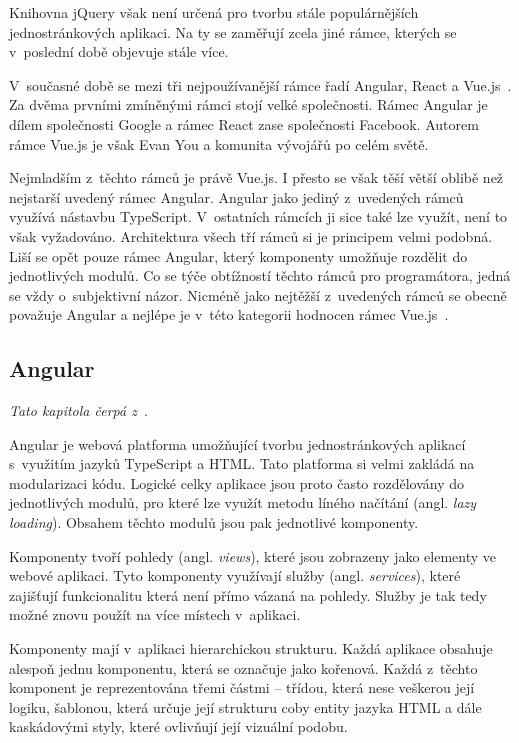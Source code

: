 Knihovna jQuery však není určená pro tvorbu stále populárnějších jednostránkových aplikaci. Na ty se zaměřují zcela jiné rámce, kterých se v~poslední době objevuje stále více.

V~současné době se mezi tři nejpoužívanější rámce řadí Angular, React a Vue.js~\cite{bib:js-framework}. Za dvěma prvními zmíněnými rámci stojí velké společnosti. Rámec Angular je dílem společnosti Google a rámec React zase společnosti Facebook. Autorem rámce Vue.js je však Evan You a komunita vývojářů po celém světě.

Nejmladším z~těchto rámců je právě Vue.js. I přesto se však těší větší oblibě než nejstarší uvedený rámec Angular. Angular jako jediný z~uvedených rámců využívá nástavbu TypeScript. V~ostatních rámcích ji sice také lze využít, není to však vyžadováno. Architektura všech tří rámců si je principem velmi podobná. Liší se opět pouze rámec Angular, který komponenty umožňuje rozdělit do jednotlivých modulů. Co se týče obtížností těchto rámců pro programátora, jedná se vždy o~subjektivní názor. Nicméně jako nejtěžší z~uvedených rámců se obecně považuje Angular a nejlépe je v~této kategorii hodnocen rámec Vue.js~\cite{bib:angular-vs-react-vs-vue}.



\subsection{Angular}
\emph{Tato kapitola čerpá z~\cite{bib:ng-arch}}.

Angular je webová platforma umožňující tvorbu jednostránkových aplikací s~využitím jazyků TypeScript a HTML. Tato platforma si velmi zakládá na modularizaci kódu. Logické celky aplikace jsou proto často rozdělovány do jednotlivých modulů, pro které lze využít metodu líného načítání (angl. \emph{lazy loading}). Obsahem těchto modulů jsou pak jednotlivé komponenty. 

Komponenty tvoří pohledy (angl. \emph{views}), které jsou zobrazeny jako elementy ve webové aplikaci. Tyto komponenty využívají služby (angl. \emph{services}), které zajišťují funkcionalitu která není přímo vázaná na pohledy. Služby je tak tedy možné znovu použít na více místech v~aplikaci.

Komponenty mají v~aplikaci hierarchickou strukturu. Každá aplikace obsahuje alespoň jednu komponentu, která se označuje jako kořenová. Každá z~těchto komponent je reprezentována třemi částmi -- třídou, která nese veškerou její logiku, šablonou, která určuje její strukturu coby entity jazyka HTML a dále kaskádovými styly, které ovlivňují její vizuální podobu.

